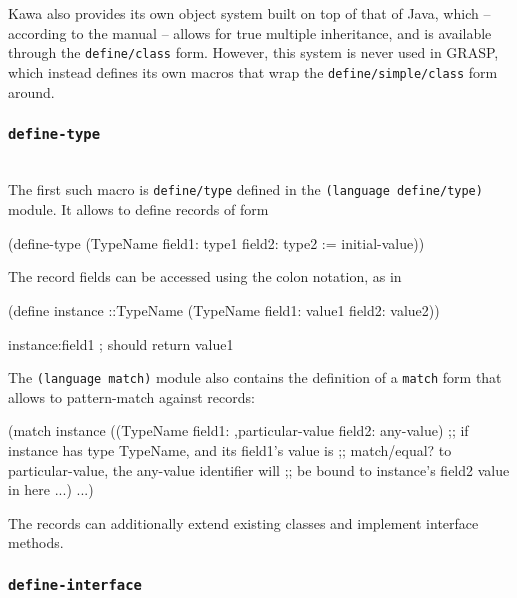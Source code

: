\documentclass[acmsmall]{acmart}
\newenvironment{Snippet}{\Verbatim[samepage=true]}{\endVerbatim}
\begin{document}
Kawa also provides its own object system built on top of
that of Java, which -- according to the manual -- allows for true
multiple inheritance, and is available through the
\texttt{define\-/class} form. However, this system is never used in
GRASP, which instead defines its own macros that wrap the
\texttt{define\-/simple\-/class} form around.

\subsubsection*{\texttt{\textbf{define-type}}} \ \\

The first such macro is \texttt{define\-/type} defined in the
\texttt{(language define\-/type)} module. It allows to define records
of form

\begin{Snippet}
  (define-type (TypeName field1: type1 
                         field2: type2 := initial-value))
\end{Snippet}

The record fields can be accessed using the colon notation, as in

\begin{Snippet}
  (define instance ::TypeName
    (TypeName field1: value1
              field2: value2))

  instance:field1 ; should return value1
\end{Snippet}

The \texttt{(language match)} module also contains the definition
of a \texttt{match} form that allows to pattern-match against records:

\begin{Snippet}
  (match instance
    ((TypeName field1: ,particular-value
               field2: any-value)
     ;; if instance has type TypeName, and its field1's value is
     ;; match/equal? to particular-value, the any-value identifier will
     ;; be bound to instance's field2 value in here
     ...)
    ...)          
\end{Snippet}

The records can additionally extend existing classes and implement
interface methods.

\subsubsection*{\texttt{\textbf{define-interface}}} \ \\
\end{document}
